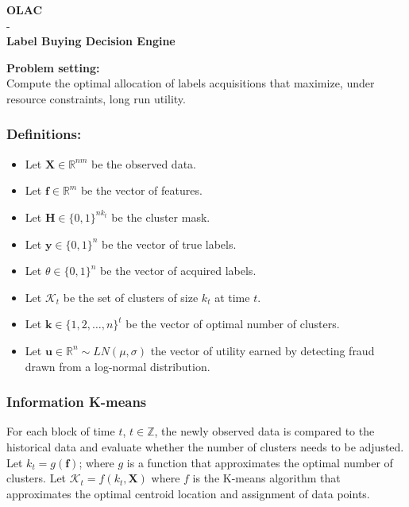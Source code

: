 \documentclass[paper=a4, fontsize=12pt]{scrartcl}
\begin{document}
\begin{center}
\Large{\textbf{OLAC}\\
- \\
\textbf{Label Buying Decision Engine}}\\[5mm]
\normalsize
\end{center}
\textbf{Problem setting:}\\
Compute the optimal allocation of labels acquisitions that maximize, under resource constraints, long run utility.\\

\subsubsection*{Definitions:}
\begin{itemize}
\item Let $\mathbf{X} \in \mathbb{R}^{nm}$ be the observed data.
\item Let $\textbf{f} \in \mathbb{R}^{m}$ be the vector of features.
\item Let $\textbf{H} \in \{0,1\}^{nk_{t}}$ be the cluster mask.
\item Let $\textbf{y} \in \{0,1\}^n$ be the vector of true labels.
\item Let $\theta \in \{0,1\}^n$ be the vector of acquired labels.
\item Let $\mathcal{K}_{t}$ be the set of clusters of size $k_{t}$ at time $t$.
\item Let $\textbf{k} \in \{1,2,\ldots,n\}^{t}$ be the vector of optimal number of clusters.
\item Let $\textbf{u} \in \mathbb{R}^{n}\sim LN(\mu, \sigma)$ the vector of utility earned by detecting fraud drawn from a log-normal distribution.
\end{itemize}
\subsubsection*{Information K-means}
For each block of time $t$, $t \in \mathbb{Z}$, the newly observed data is compared to the historical data and evaluate whether the number of clusters needs to be adjusted.\\
Let $k_{t} = g(\textbf{f})$; where $g$ is a function that approximates the optimal number of clusters.
Let $\mathcal{K}_{t} = f(k_{t}, \textbf{X})$ where $f$ is the K-means algorithm that approximates the optimal centroid location and assignment of data points.\\
\end{document}
